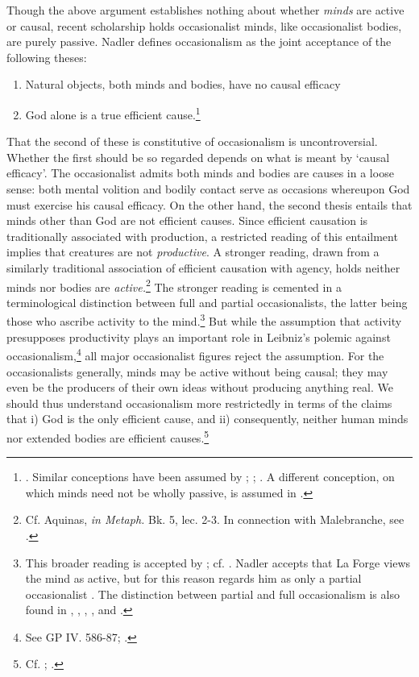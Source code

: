 \documentclass[]{article}
\begin{document}
Though the above argument establishes nothing about whether \emph{minds} are active or causal, recent scholarship holds occasionalist minds, like occasionalist bodies, are purely passive. Nadler defines occasionalism as the joint acceptance of the following theses:

\begin{enumerate}
	\item Natural objects, both minds and bodies, have no causal efficacy
	\item God alone is a true efficient cause.\footnote{\autocite[39]{Nadler2005}. Similar conceptions have been assumed by \autocite[45-46]{Pyle2003}; \autocite[174]{Battail1973}; \autocite[288]{Winkler2011}. A different conception, on which minds need not be wholly passive, is assumed in \autocite[358]{Radner1993}.}
\end{enumerate}

That the second of these is constitutive of occasionalism is uncontroversial. Whether the first should be so regarded depends on what is meant by `causal efficacy'. The occasionalist admits both minds and bodies are causes in a loose sense: both mental volition and bodily contact serve as occasions whereupon God must exercise his causal efficacy. On the other hand, the second thesis entails that minds other than God are not efficient causes. Since efficient causation is traditionally associated with production, a restricted reading of this entailment implies that creatures are not \emph{productive}. A stronger reading, drawn from a similarly traditional association of efficient causation with agency, holds neither minds nor bodies are \emph{active.}\footnote{Cf. Aquinas, \emph{in Metaph.} Bk. 5, lec. 2-3. In connection with Malebranche, see \autocite[255-256]{Baker2005}.} The stronger reading is cemented in a terminological distinction between full and partial occasionalists, the latter being those who ascribe activity to the mind.\footnote{This broader reading is accepted by \autocite{Nadler2005}; cf. \autocite[288]{Winkler2011}. Nadler accepts that La Forge views the mind as active, but for this reason regards him as only a partial occasionalist \autocite[227]{Nadler1998}. The distinction between partial and full occasionalism is also found in \autocite{Radner1993}, \autocite{Garber1987}, \autocite{Clarke2000}, \autocite{Bardout2002}, and \autocite{Kolesnik2006}.} But while the assumption that activity presupposes productivity plays an important role in Leibniz's polemic against occasionalism,\footnote{See GP IV. 586-87; \autocite{Rutherford1993}.} all major occasionalist figures reject the assumption. For the occasionalists generally, minds may be active without being causal; they may even be the producers of their own ideas without producing anything real. We should thus understand occasionalism more restrictedly in terms of the claims that i) God is the only efficient cause, and ii) consequently, neither human minds nor extended bodies are efficient causes.\footnote{Cf. \autocite[625-626]{Platt2011}; \autocite[101]{Gouhier1926}.}
\end{document}
